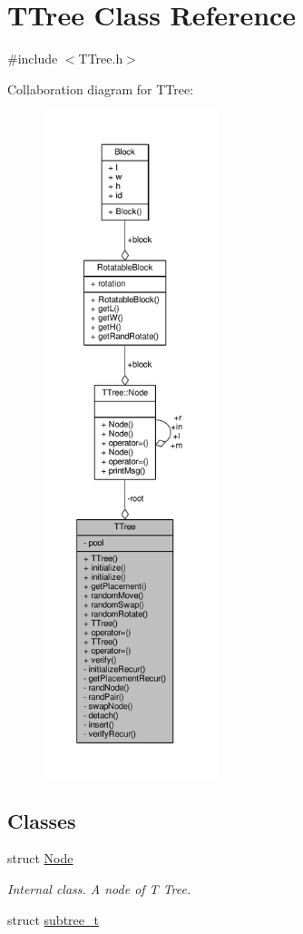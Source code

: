 \hypertarget{classTTree}{}\section{T\+Tree Class Reference}
\label{classTTree}


{\ttfamily \#include $<$T\+Tree.\+h$>$}



Collaboration diagram for T\+Tree\+:
\nopagebreak
\begin{figure}[H]
\begin{center}
\leavevmode
\includegraphics[height=550pt]{classTTree__coll__graph}
\end{center}
\end{figure}
\subsection*{Classes}
\begin{DoxyCompactItemize}
\item 
struct \hyperlink{structTTree_1_1Node}{Node}
\begin{DoxyCompactList}\small\item\em Internal class. A node of T Tree. \end{DoxyCompactList}\item 
struct \hyperlink{structTTree_1_1subtree__t}{subtree\+\_\+t}
\end{DoxyCompactItemize}
